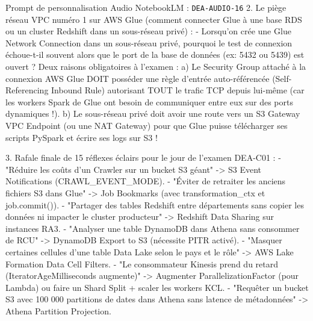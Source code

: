 \documentclass[11pt,a4paper]{article}
\begin{document}
\begin{promptbox}{Prompt de personnalisation Audio NotebookLM : \texttt{DEA-AUDIO-16}}
2. Le piège réseau VPC numéro 1 sur AWS Glue (comment connecter Glue à une base RDS ou un cluster Redshift dans un sous-réseau privé) :
- Lorsqu'on crée une Glue Network Connection dans un sous-réseau privé, pourquoi le test de connexion échoue-t-il souvent alors que le port de la base de données (ex: 5432 ou 5439) est ouvert ?
  Deux raisons obligatoires à l'examen :
  a) Le Security Group attaché à la connexion AWS Glue DOIT posséder une règle d'entrée auto-référencée (Self-Referencing Inbound Rule) autorisant TOUT le trafic TCP depuis lui-même (car les workers Spark de Glue ont besoin de communiquer entre eux sur des ports dynamiques !).
  b) Le sous-réseau privé doit avoir une route vers un S3 Gateway VPC Endpoint (ou une NAT Gateway) pour que Glue puisse télécharger ses scripts PySpark et écrire ses logs sur S3 !

3. Rafale finale de 15 réflexes éclairs pour le jour de l'examen DEA-C01 :
- "Réduire les coûts d'un Crawler sur un bucket S3 géant" -> S3 Event Notifications (CRAWL\_EVENT\_MODE).
- "Éviter de retraiter les anciens fichiers S3 dans Glue" -> Job Bookmarks (avec transformation\_ctx et job.commit()).
- "Partager des tables Redshift entre départements sans copier les données ni impacter le cluster producteur" -> Redshift Data Sharing sur instances RA3.
- "Analyser une table DynamoDB dans Athena sans consommer de RCU" -> DynamoDB Export to S3 (nécessite PITR activé).
- "Masquer certaines cellules d'une table Data Lake selon le pays et le rôle" -> AWS Lake Formation Data Cell Filters.
- "Le consommateur Kinesis prend du retard (IteratorAgeMilliseconds augmente)" -> Augmenter ParallelizationFactor (pour Lambda) ou faire un Shard Split + scaler les workers KCL.
- "Requêter un bucket S3 avec 100 000 partitions de dates dans Athena sans latence de métadonnées" -> Athena Partition Projection.
\end{promptbox}
\end{document}
